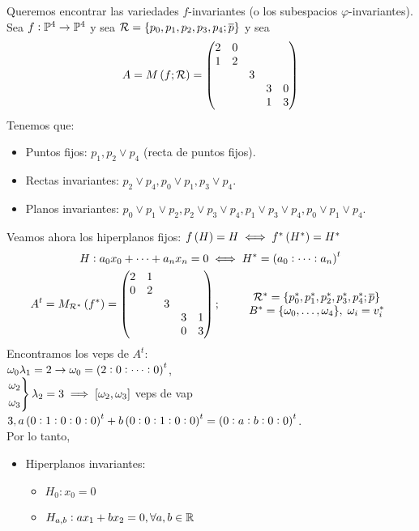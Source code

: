 \begin{example}
	Queremos encontrar las variedades $f$-invariantes (o los subespacios $\varphi$-invariantes). \\
	Sea $f:\mathbb{P}^4\to\mathbb{P}^4$ y sea $\mathcal{R} = \{p_0, p_1,p_2,p_3,p_4;\overline{p}\}$ y sea
	\[
		A = M\left( f;\mathcal{R}\right) =
		\begin{pmatrix}
			2 & 0 &   &   &   \\
			1 & 2 &   &   &   \\
			  &   & 3 &   &   \\
			  &   &   & 3 & 0 \\
			  &   &   & 1 & 3 \\
		\end{pmatrix}
	\]
	Tenemos que:
	\begin{itemize}
		\item Puntos fijos: $p_1, p_2 \vee p_4$ (recta de puntos fijos).
		\item Rectas invariantes: $p_2 \vee p_4, p_0 \vee p_1, p_3 \vee p_4$.
		\item Planos invariantes: $p_0 \vee p_1 \vee p_2, p_2 \vee p_3 \vee p_4, p_1 \vee p_3 \vee p_4, p_0 \vee p_1 \vee p_4$.
	\end{itemize}
	Veamos ahora los hiperplanos fijos: $f\left( H\right) = H \iff f^*\left( H^*\right) = H^*$
	\begin{gather*}
		H:a_0x_0+\dots+a_nx_n=0 \iff H^* = \left( a_0:\dots:a_n\right)^t \\
		A^t= M_{\mathcal{R}^*}\left( f^*\right) = \begin{pmatrix}
			2 & 1 &   &   &   \\
			0 & 2 &   &   &   \\
			  &   & 3 &   &   \\
			  &   &   & 3 & 1 \\
			  &   &   & 0 & 3 \\
		\end{pmatrix}; \qquad
		\begin{array}{c}
			\mathcal{R}^* = \{p_0^*,p_1^*,p_2^*,p_3^*,p_4^*;\overline{p}\} \\
			B^* = \{\omega_0,\dots,\omega_4\}, \; \omega_i = v_i^*
		\end{array}
	\end{gather*}
	Encontramos los veps de $A^t$: \\
	\indent $\omega_0 \lambda_1 = 2 \rightarrow \omega_0 = \left( 2:0:\dots:0\right)^t$, \\
	\indent $\begin{rcases} \omega_2 \\ \omega_3 \end{rcases} \lambda_2 = 3 \implies [\omega_2, \omega_3]$ veps de vap $3, a\left(0:1:0:0:0\right)^t + b\left(0:0:1:0:0\right)^t = \left( 0:a:b:0:0\right)^t$. \\
	Por lo tanto,
	\begin{itemize}
		\item Hiperplanos invariantes:
		\begin{itemize}
			\item $H_0 : x_0 = 0$
			\item $H_{a,b} : ax_1 + bx_2 = 0, \forall a, b \in \mathbb{R}$
		\end {itemize}
	\end{itemize}
\end{example}
